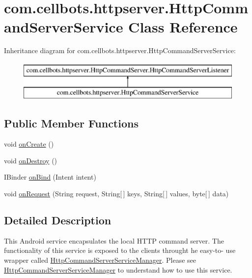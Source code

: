 \hypertarget{classcom_1_1cellbots_1_1httpserver_1_1_http_command_server_service}{\section{com.\-cellbots.\-httpserver.\-Http\-Command\-Server\-Service Class Reference}
\label{classcom_1_1cellbots_1_1httpserver_1_1_http_command_server_service}
}
Inheritance diagram for com.\-cellbots.\-httpserver.\-Http\-Command\-Server\-Service\-:\begin{figure}[H]
\begin{center}
\leavevmode
\includegraphics[height=2.000000cm]{classcom_1_1cellbots_1_1httpserver_1_1_http_command_server_service}
\end{center}
\end{figure}
\subsection*{Public Member Functions}
\begin{DoxyCompactItemize}
\item 
void \hyperlink{classcom_1_1cellbots_1_1httpserver_1_1_http_command_server_service_ac81c95acde2dd9157004b4141633a22c}{on\-Create} ()
\item 
void \hyperlink{classcom_1_1cellbots_1_1httpserver_1_1_http_command_server_service_aaf9d8d5ee9a6671dea88d26e67f3a1b1}{on\-Destroy} ()
\item 
I\-Binder \hyperlink{classcom_1_1cellbots_1_1httpserver_1_1_http_command_server_service_ac29da5166ff3585f32dd446c3a7814be}{on\-Bind} (Intent intent)
\item 
void \hyperlink{classcom_1_1cellbots_1_1httpserver_1_1_http_command_server_service_a9395b256711b651f18dbdbe2e413459d}{on\-Request} (String request, String\mbox{[}$\,$\mbox{]} keys, String\mbox{[}$\,$\mbox{]} values, byte\mbox{[}$\,$\mbox{]} data)
\end{DoxyCompactItemize}


\subsection{Detailed Description}
This Android service encapsulates the local H\-T\-T\-P command server. The functionality of this service is exposed to the clients throught he easy-\/to-\/ use wrapper called \hyperlink{classcom_1_1cellbots_1_1httpserver_1_1_http_command_server_service_manager}{Http\-Command\-Server\-Service\-Manager}. Please see \hyperlink{classcom_1_1cellbots_1_1httpserver_1_1_http_command_server_service_manager}{Http\-Command\-Server\-Service\-Manager} to understand how to use this service.

